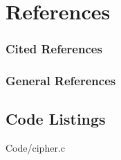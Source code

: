 \documentclass[12pt,tightenlines,letterpaper,listof=totoc]{scrartcl}
\begin{document}

\section{References}
\subsubsection*{Cited References}
\printbibliography[heading=none,category=cited]

\subsubsection*{General References}
\printbibliography[heading=none,notcategory=cited,resetnumbers=true] 
\linespread{1}

\begin{appendices}
\section{Code Listings}

{Code/cipher.c}

\end{appendices}
\end{document}
